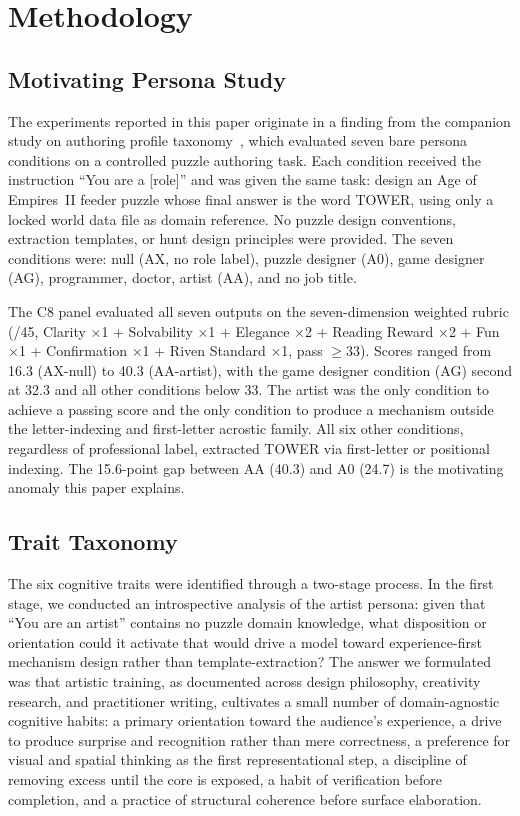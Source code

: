 \section{Methodology}
\label{sec:methodology}

\subsection{Motivating Persona Study}

The experiments reported in this paper originate in a finding from the companion study on authoring profile taxonomy~\cite{dellaLibera2025taxonomy}, which evaluated seven bare persona conditions on a controlled puzzle authoring task. Each condition received the instruction ``You are a [role]'' and was given the same task: design an Age of Empires~II feeder puzzle whose final answer is the word TOWER, using only a locked world data file as domain reference. No puzzle design conventions, extraction templates, or hunt design principles were provided. The seven conditions were: null (AX, no role label), puzzle designer (A0), game designer (AG), programmer, doctor, artist (AA), and no job title.

The C8 panel evaluated all seven outputs on the seven-dimension weighted rubric (/45, Clarity ×1 + Solvability ×1 + Elegance ×2 + Reading Reward ×2 + Fun ×1 + Confirmation ×1 + Riven Standard ×1, pass $\geq 33$). Scores ranged from 16.3 (AX-null) to 40.3 (AA-artist), with the game designer condition (AG) second at 32.3 and all other conditions below 33. The artist was the only condition to achieve a passing score and the only condition to produce a mechanism outside the letter-indexing and first-letter acrostic family. All six other conditions, regardless of professional label, extracted TOWER via first-letter or positional indexing. The 15.6-point gap between AA (40.3) and A0 (24.7) is the motivating anomaly this paper explains.

\subsection{Trait Taxonomy}

The six cognitive traits were identified through a two-stage process. In the first stage, we conducted an introspective analysis of the artist persona: given that ``You are an artist'' contains no puzzle domain knowledge, what disposition or orientation could it activate that would drive a model toward experience-first mechanism design rather than template-extraction? The answer we formulated was that artistic training, as documented across design philosophy, creativity research, and practitioner writing, cultivates a small number of domain-agnostic cognitive habits: a primary orientation toward the audience's experience, a drive to produce surprise and recognition rather than mere correctness, a preference for visual and spatial thinking as the first representational step, a discipline of removing excess until the core is exposed, a habit of verification before completion, and a practice of structural coherence before surface elaboration.

